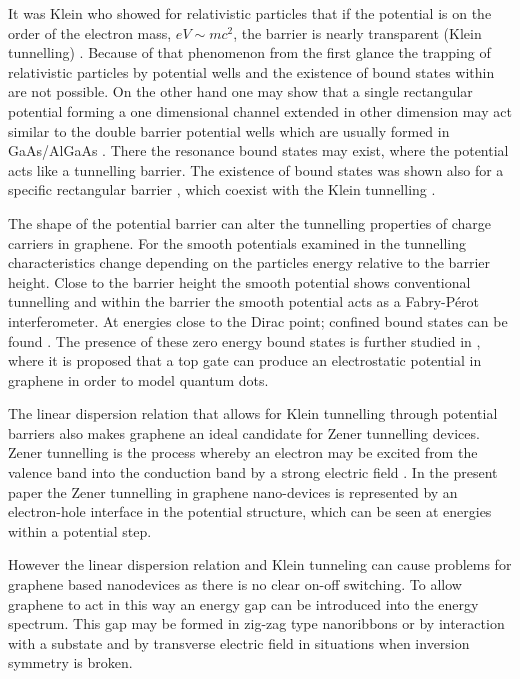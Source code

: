 \documentclass[prl,twocolumn,aps,superscriptaddress,floatfix,10pt]{revtex4}
\begin{document}
	It was Klein who showed for relativistic particles that if the potential is on the order of the electron mass, $eV \sim mc^2$, the barrier is nearly transparent (Klein tunnelling) \cite{Klein-1929}. Because of that phenomenon from the first glance the trapping of relativistic particles by potential wells and the existence of bound states within are not possible. On the other hand one may show that a single rectangular potential forming a one dimensional channel extended in other dimension may act similar to the double barrier potential wells \cite{Silvestrov07} which are usually formed in GaAs/AlGaAs \cite{Leo91}. There the resonance bound states may exist, where the potential acts like a tunnelling barrier. The existence of bound states was shown also for a specific rectangular barrier \cite{Pereira06}, which coexist with the Klein tunnelling \cite{Klein-1929}.


	The shape of the potential barrier can alter the tunnelling properties of charge carriers in graphene. For the smooth potentials examined in \cite{c1,d3} the tunnelling characteristics change depending on the particles energy relative to the barrier height. Close to the barrier height the smooth potential shows conventional tunnelling and within the barrier the smooth potential acts as a Fabry-P\'{e}rot interferometer. At energies close to the Dirac point; confined bound states can be found \cite{c1, c2, c3}. The presence of these zero energy bound states is further studied in \cite{c4, c5}, where it is proposed that a top gate can produce an electrostatic potential in graphene in order to model quantum dots.


	The linear dispersion relation that allows for Klein tunnelling through potential barriers also makes graphene an ideal candidate for Zener tunnelling devices. Zener tunnelling is the process whereby an electron may be excited from the valence band into the conduction band by a strong electric field \cite{d1,d2}. In the present paper the Zener tunnelling in graphene nano-devices is represented by an electron-hole interface in the potential structure, which can be seen at energies within a potential step.


	However the linear dispersion relation and Klein tunneling can cause problems for graphene based nanodevices as there is no clear on-off switching. To allow graphene to act in this way an energy gap can be introduced into the energy spectrum. This gap may be formed in zig-zag type nanoribbons \cite{b1} or by interaction with a substate and by transverse electric field \cite{OHare12} in situations when inversion symmetry is broken.
\end{document}
